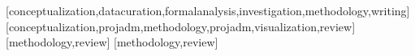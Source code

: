 \documentclass[portuguese]{textolivre}
\begin{document}
\printbibliography\label{sec-bib}
\begin{contributors}
[conceptualization,datacuration,formalanalysis,investigation,methodology,writing]
[conceptualization,projadm,methodology,projadm,visualization,review]
[methodology,review]
[methodology,review]
\end{contributors}
\end{document}
